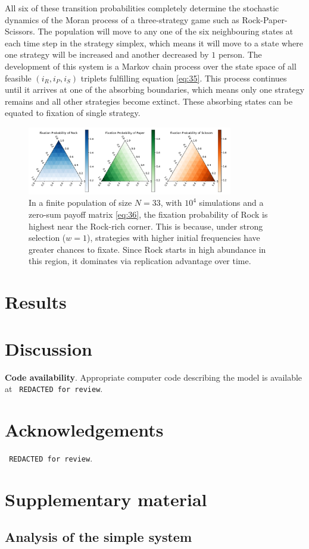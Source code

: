 \documentclass{article}
\begin{document}
All six of these transition probabilities completely determine the stochastic dynamics of the Moran process of a three-strategy game such as Rock-Paper-Scissors.
The population will move to any one of the six neighbouring states at each time step in the strategy simplex, which means it will move to a state where one strategy will be increased and another decreased by $1$ person.
The development of this system is a Markov chain process over the state space of all feasible $(i_R, i_P, i_S)$ triplets fulfilling equation \eqref{eq:35}.
This process continues until it arrives at one of the absorbing boundaries, which means only one strategy remains and all other strategies become extinct.
These absorbing states can be equated to fixation of single strategy.
\begin{figure}[H]
    \centering
    \includegraphics[width=0.8\textwidth]{RPS_FP.pdf}
    \caption{In a finite population of size $N = 33$, with $10^4$ simulations and a zero-sum payoff matrix \eqref{eq:36}, the fixation probability of Rock is highest near the Rock-rich corner. This is because, under strong selection ($w = 1$), strategies with higher initial frequencies have greater chances to fixate. Since Rock starts in high abundance in this region, it dominates via replication advantage over time.}
    \label{fig:6}
\end{figure}



\section{Results}
\section{Discussion}


\textbf{Code availability}.
Appropriate computer code describing the model is available at 
\texttt{ REDACTED for review}.%

\section{Acknowledgements}
\texttt{ REDACTED for review}.%





\renewcommand{\theequation}{SI.\arabic{equation}}
\setcounter{equation}{0}

\renewcommand{\thefigure}{SI.\arabic{figure}}
\setcounter{figure}{0}

\section{Supplementary material}


\subsection{Analysis of the simple system}
\end{document}
